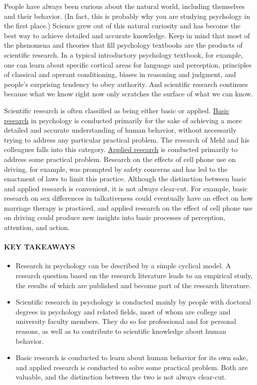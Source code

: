 \documentclass[
]{krantz}
\providecommand{\tightlist}{%
  \setlength{\itemsep}{0pt}\setlength{\parskip}{0pt}}
\begin{document}
People have always been curious about the natural world, including themselves and their behavior. (In fact, this is probably why you are studying psychology in the first place.) Science grew out of this natural curiosity and has become the best way to achieve detailed and accurate knowledge. Keep in mind that most of the phenomena and theories that fill psychology textbooks are the products of scientific research. In a typical introductory psychology textbook, for example, one can learn about specific cortical areas for language and perception, principles of classical and operant conditioning, biases in reasoning and judgment, and people's surprising tendency to obey authority. And scientific research continues because what we know right now only scratches the surface of what we can know.

Scientific research is often classified as being either basic or applied. \protect\hyperlink{basic-research}{Basic research} in psychology is conducted primarily for the sake of achieving a more detailed and accurate understanding of human behavior, without necessarily trying to address any particular practical problem. The research of Mehl and his colleagues falls into this category. \protect\hyperlink{applied-research}{Applied research} is conducted primarily to address some practical problem. Research on the effects of cell phone use on driving, for example, was prompted by safety concerns and has led to the enactment of laws to limit this practice. Although the distinction between basic and applied research is convenient, it is not always clear-cut. For example, basic research on sex differences in talkativeness could eventually have an effect on how marriage therapy is practiced, and applied research on the effect of cell phone use on driving could produce new insights into basic processes of perception, attention, and action.

\hypertarget{key-takeaways-1}{%
\paragraph*{KEY TAKEAWAYS}\label{key-takeaways-1}}

\begin{itemize}
\tightlist
\item
  Research in psychology can be described by a simple cyclical model. A research question based on the research literature leads to an empirical study, the results of which are published and become part of the research literature.
\item
  Scientific research in psychology is conducted mainly by people with doctoral degrees in psychology and related fields, most of whom are college and university faculty members. They do so for professional and for personal reasons, as well as to contribute to scientific knowledge about human behavior.
\item
  Basic research is conducted to learn about human behavior for its own sake, and applied research is conducted to solve some practical problem. Both are valuable, and the distinction between the two is not always clear-cut.
\end{itemize}
\end{document}
